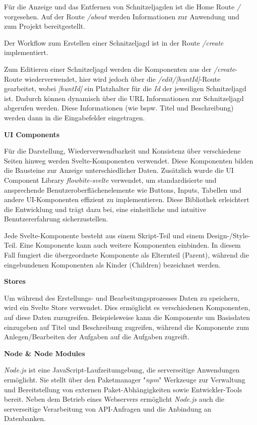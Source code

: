 Für die Anzeige und das Entfernen von Schnitzeljagden ist die Home Route \textit{/} vorgesehen. Auf der Route \textit{/about} werden Informationen zur Anwendung und zum Projekt bereitgestellt.

Der Workflow zum Erstellen einer Schnitzeljagd ist in der Route \textit{/create} implementiert.

Zum Editieren einer Schnitzeljagd werden die Komponenten aus der \textit{/create}-Route wiederverwendet, hier wird jedoch über die \textit{/edit/[huntId]}-Route gearbeitet, wobei \textit{[huntId]} ein Platzhalter für die \textit{Id} der jeweiligen Schnitzeljagd ist. Dadurch können dynamisch über die URL Informationen zur Schnitzeljagd abgerufen werden. Diese Informationen (wie bspw. Titel und Beschreibung) werden dann in die Eingabefelder eingetragen. 

\textbf{UI Components}

Für die Darstellung, Wiederverwendbarkeit und Konsistenz über verschiedene Seiten hinweg werden Svelte-Komponenten verwendet. Diese Komponenten bilden die Bausteine zur Anzeige unterschiedlicher Daten. Zusätzlich wurde die UI Component Library \textit{flowbite-svelte} verwendet, um standardisierte und ansprechende Benutzeroberflächenelemente wie Buttons, Inputs, Tabellen und andere UI-Komponenten effizient zu implementieren. Diese Bibliothek erleichtert die Entwicklung und trägt dazu bei, eine einheitliche und intuitive Benutzererfahrung sicherzustellen.

Jede Svelte-Komponente besteht aus einem Skript-Teil und einem Design-/Style-Teil. Eine Komponente kann auch weitere Komponenten einbinden. In diesem Fall fungiert die übergeordnete Komponente als Elternteil (Parent), während die eingebundenen Komponenten als Kinder (Children) bezeichnet werden.

\textbf{Stores}

Um während des Erstellungs- und Bearbeitungsprozesses Daten zu speichern, wird ein Svelte Store verwendet. Dies ermöglicht es verschiedenen Komponenten, auf diese Daten zuzugreifen. Beispielsweise kann die Komponente um Basisdaten einzugeben auf Titel und Beschreibung zugreifen, während die Komponente zum Anlegen/Bearbeiten der Aufgaben auf die Aufgaben zugreift.

\textbf{Node \& Node Modules}

\textit{Node.js} ist eine JavaScript-Laufzeitumgebung, die serverseitige Anwendungen ermöglicht. Sie stellt über den Paketmanager "\textit{npm}" Werkzeuge zur Verwaltung und Bereitstellung von externen Paket-Abhängigkeiten sowie Entwickler-Tools bereit. Neben dem Betrieb eines Webservers ermöglicht \textit{Node.js} auch die serverseitige Verarbeitung von API-Anfragen und die Anbindung an Datenbanken.

